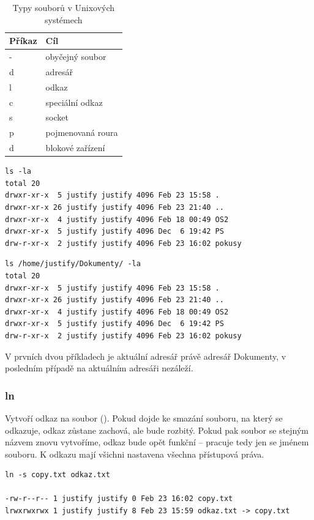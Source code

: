 \documentclass{article}
\begin{document}
\begin{table}
\begin{center}
\begin{tabular}{l | l}
Příkaz & Cíl\\
\hline
- & obyčejný soubor\\
d & adresář\\
l & odkaz\\
c & speciální odkaz\\
s & socket\\
p & pojmenovaná roura\\
d & blokové zařízení\\
\end{tabular}
\end{center}
\caption{Typy souborů v Unixových systémech}
\label{tabfiles}
\end{table}

\begin{verbatim}
ls -la
total 20
drwxr-xr-x  5 justify justify 4096 Feb 23 15:58 .
drwxr-xr-x 26 justify justify 4096 Feb 23 21:40 ..
drwxr-xr-x  4 justify justify 4096 Feb 18 00:49 OS2
drwxr-xr-x  5 justify justify 4096 Dec  6 19:42 PS
drw-r-xr-x  2 justify justify 4096 Feb 23 16:02 pokusy
\end{verbatim}

\begin{verbatim}
ls /home/justify/Dokumenty/ -la
total 20
drwxr-xr-x  5 justify justify 4096 Feb 23 15:58 .
drwxr-xr-x 26 justify justify 4096 Feb 23 21:40 ..
drwxr-xr-x  4 justify justify 4096 Feb 18 00:49 OS2
drwxr-xr-x  5 justify justify 4096 Dec  6 19:42 PS
drw-r-xr-x  2 justify justify 4096 Feb 23 16:02 pokusy
\end{verbatim}
V prvních dvou příkladech je aktuální adresář právě adresář Dokumenty, v posledním případě na aktuálním adresáři nezáleží.

\subsubsection{ln}
Vytvoří odkaz na soubor (). Pokud dojde ke smazání souboru, na který se odkazuje, odkaz zůstane zachová, ale bude rozbitý. Pokud pak soubor se stejným názvem znovu vytvoříme, odkaz bude opět funkční -- pracuje tedy jen se jménem souboru. K odkazu mají všichni nastavena všechna přístupová práva.

\begin{verbatim}
ln -s copy.txt odkaz.txt 

-rw-r--r-- 1 justify justify 0 Feb 23 16:02 copy.txt
lrwxrwxrwx 1 justify justify 8 Feb 23 15:59 odkaz.txt -> copy.txt
\end{verbatim}
\end{document}
